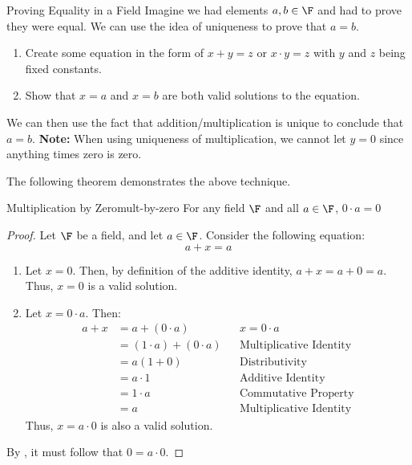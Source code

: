 \documentclass[letterpaper,12pt]{report}
\begin{document}
\begin{tecbox}{Proving Equality in a Field}{}
	Imagine we had elements $a,b \in \F$ and had to prove they were equal. We can use the idea of uniqueness to prove that $a=b$.
	\begin{enumerate}
		\item Create some equation in the form of $x+y = z$ or $x \cdot y = z$ with $y$ and $z$ being fixed constants.
		\item Show that $x=a$ and $x=b$ are both valid solutions to the equation.
	\end{enumerate}
	We can then use the fact that addition/multiplication is unique to conclude that $a=b$.
	\tcblower
	\textbf{Note:} When using uniqueness of multiplication, we cannot let $y = 0$ since anything times zero is zero.
\end{tecbox}

The following theorem demonstrates the above technique.

\begin{thmbox}{Multiplication by Zero}{mult-by-zero}
	For any field $\F$ and all $a \in \F$, $0 \cdot a = 0$
	\tcblower
	\begin{proof}
		Let $\F$ be a field, and let $a \in \F$. Consider the following equation:
		\[ a + x = a \]
		\begin{enumerate}
			\item Let $x = 0$. Then, by definition of the additive identity, $a+x = a + 0 = a$. Thus, $x = 0$ is a valid solution.
			\item Let $x = 0 \cdot a$. Then:
			\begin{align*}
				a + x &= a + (0 \cdot a) && x = 0 \cdot a \\
				&= (1 \cdot a) + (0 \cdot a) && \text{Multiplicative Identity} \\
				&= a (1 + 0) && \text{Distributivity} \\
				&= a \cdot 1 && \text{Additive Identity} \\
				&= 1 \cdot a && \text{Commutative Property} \\
				&= a && \text{Multiplicative Identity}
			\end{align*}
			Thus, $x = a \cdot 0$ is also a valid solution.
		\end{enumerate}
		By , it must follow that $0 = a \cdot 0$.
	\end{proof}
\end{thmbox}
\end{document}
